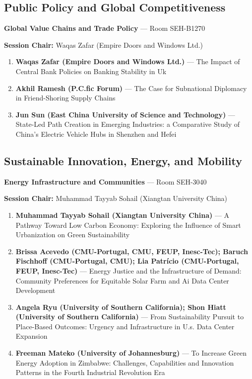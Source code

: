 \documentclass[
  10pt,
  letterpaper,
  DIV=11,
  numbers=noendperiod]{scrartcl}
\begin{document}
\subsection{\texorpdfstring{\textcolor{policy}{Public Policy and Global Competitiveness}}{}}\label{section-19}

\textbf{Global Value Chains and Trade Policy} --- Room SEH-B1270

\textbf{Session Chair:} Waqas Zafar (Empire Doors and Windows Ltd.)

\begin{enumerate}
\def\labelenumi{\arabic{enumi}.}
\item
  \textbf{Waqas Zafar (Empire Doors and Windows Ltd.)} --- The Impact of
  Central Bank Policies on Banking Stability in Uk
\item
  \textbf{Akhil Ramesh (P.C.fic Forum)} --- The Case for Subnational
  Diplomacy in Friend-Shoring Supply Chains
\item
  \textbf{Jun Sun (East China University of Science and Technology)} ---
  State-Led Path Creation in Emerging Industries: a Comparative Study of
  China's Electric Vehicle Hubs in Shenzhen and Hefei
\end{enumerate}

\subsection{\texorpdfstring{\textcolor{sustainability}{Sustainable Innovation, Energy, and Mobility}}{}}\label{section-20}

\textbf{Energy Infrastructure and Communities} --- Room SEH-3040

\textbf{Session Chair:} Muhammad Tayyab Sohail (Xiangtan University
China)

\begin{enumerate}
\def\labelenumi{\arabic{enumi}.}
\item
  \textbf{Muhammad Tayyab Sohail (Xiangtan University China)} --- A
  Pathway Toward Low Carbon Economy: Exploring the Influence of Smart
  Urbanization on Green Sustainability
\item
  \textbf{Brissa Acevedo (CMU-Portugal, CMU, FEUP, Inesc-Tec); Baruch
  Fischhoff (CMU-Portugal, CMU); Lia Patrício (CMU-Portugal, FEUP,
  Inesc-Tec)} --- Energy Justice and the Infrastructure of Demand:
  Community Preferences for Equitable Solar Farm and Ai Data Center
  Development
\item
  \textbf{Angela Ryu (University of Southern California); Shon Hiatt
  (University of Southern California)} --- From Sustainability Pursuit
  to Place-Based Outcomes: Urgency and Infrastructure in U.s. Data
  Center Expansion
\item
  \textbf{Freeman Mateko (University of Johannesburg)} --- To Increase
  Green Energy Adoption in Zimbabwe: Challenges, Capabilities and
  Innovation Patterns in the Fourth Industrial Revolution Era
\end{enumerate}
\end{document}
